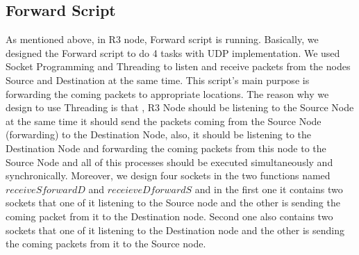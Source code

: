 \documentclass[conference]{IEEEtran}
\begin{document}
\subsection{Forward Script}\label{BB}
As mentioned above, in R3 node, Forward script is running. Basically, we designed the Forward script to do 4 tasks with UDP implementation. We used Socket Programming and Threading to listen and receive packets from the nodes Source and Destination at the same time. This script's main purpose is forwarding the coming packets to appropriate locations. The reason why we design to use Threading is that , R3 Node should be listening to the Source Node at the same time it should send the packets coming from the Source Node (forwarding) to the Destination Node, also, it should be listening to the Destination Node and forwarding the coming packets from this node to the Source Node and all of this processes should be executed simultaneously and synchronically. Moreover, we design four sockets in the two functions named $receiveSforwardD$ and $receieveDforwardS$ and in the first one it contains two sockets that one of it listening to the Source node and the other is sending the coming packet from it to the Destination node. Second one also contains two sockets that one of it listening to the Destination node and the other is sending the coming packets from it to the Source node.
\end{document}
